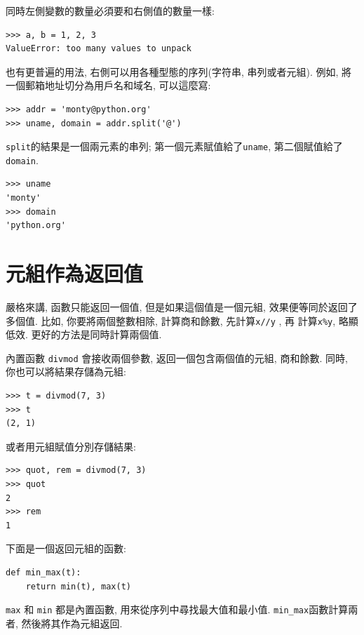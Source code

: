 \documentclass[10pt]{book}
\begin{document}
同時左側變數的數量必須要和右側值的數量一樣:

\begin{verbatim}
>>> a, b = 1, 2, 3
ValueError: too many values to unpack
\end{verbatim}
%
也有更普遍的用法, 右側可以用各種型態的序列(字符串, 串列或者元組). 
例如, 將一個郵箱地址切分為用戶名和域名, 可以這麼寫:

\begin{verbatim}
>>> addr = 'monty@python.org'
>>> uname, domain = addr.split('@')
\end{verbatim}
%
{\tt split}的結果是一個兩元素的串列;
第一個元素賦值給了{\tt uname}, 第二個賦值給了{\tt domain}. 

\begin{verbatim}
>>> uname
'monty'
>>> domain
'python.org'
\end{verbatim}
%

\section{元組作為返回值}
嚴格來講, 函數只能返回一個值, 但是如果這個值是一個元組, 
效果便等同於返回了多個值. 
比如, 你要將兩個整數相除, 計算商和餘數, 先計算{\tt x//y} , 再
計算{\tt x\%y}, 略顯低效. 更好的方法是同時計算兩個值. 

內置函數 {\tt divmod} 會接收兩個參數, 返回一個包含兩個值的元組, 
商和餘數. 同時, 你也可以將結果存儲為元組:

\begin{verbatim}
>>> t = divmod(7, 3)
>>> t
(2, 1)
\end{verbatim}
%
或者用元組賦值分別存儲結果:

\begin{verbatim}
>>> quot, rem = divmod(7, 3)
>>> quot
2
>>> rem
1
\end{verbatim}
%
下面是一個返回元組的函數:

\begin{verbatim}
def min_max(t):
    return min(t), max(t)
\end{verbatim}
%
{\tt max} 和 {\tt min} 都是內置函數,  用來從序列中尋找最大值和最小值. 
\verb"min_max"函數計算兩者, 然後將其作為元組返回. 
\end{document}
